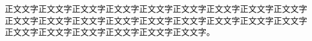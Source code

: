 

\begin{appendixpage}
正文文字正文文字正文文字正文文字正文文字正文文字正文文字正文文字正文文字正文文字正文文字正文文字正文文字正文文字正文文字正文文字正文文字正文文字正文文字正文文字正文文字正文文字正文文字正文文字。
\end{appendixpage}
